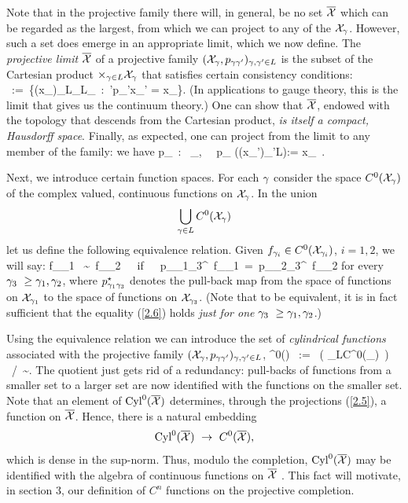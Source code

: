 Note that in the projective family there will, in general, be no set
${{\overline {{\cal X}}}}$ which can be regarded as the largest, from which we can
project to any of the ${\cal X}_\gamma$. However, such a set does emerge in an
appropriate limit, which we now define. The {\it projective limit}
${\overline {{\cal X}}}$ of a projective family $({\cal X}_\gamma, p_{\gamma\gamma'})_{\gamma,\gamma'\in L}$ is the
subset of the Cartesian product $\times_{\gamma\in L}{\cal X}_\gamma$ that
satisfies certain consistency conditions:
%
\be \label{2.4}
\Xb\ :=\ \{(x_\g)_{\g\in L}\in \times_{\g\in L}\X_\g\  
:\ \g'\ge \g \Rightarrow p_{\g\g'}x_{\g'} = x_\g\}. 
\ee
%
(In applications to gauge theory, this is the limit that gives us the
continuum theory.)  One can show that ${\overline {{\cal X}}}$, endowed with the topology
that descends from the Cartesian product, {\it is itself a compact,
Hausdorff space}.  Finally, as expected, one can project from the
limit to any member of the family: we have
%
\be\label{2.5}
 p_{\g}\ : \ \Xb \rightarrow \X_{\g}, \ \  
p_{\g} ((x_{\g'})_{\g'\in L}):= x_{\g}\  .\ee
%

Next, we introduce certain function spaces. For each $\gamma$ consider
the space $C^0({\cal X}_\gamma)$ of the complex valued, continuous functions on
${\cal X}_\gamma$. In the union 
%
$$\bigcup_{\gamma\in L} C^0({\cal X}_{\gamma})$$ 
%
let us define the following equivalence relation. Given $f_{\gamma_i}\in
C^0({\cal X}_{\gamma_i})$, $i=1,2$, we will say:
%
\be
\label{2.6}  f_{\g_1} \ \sim\ f_{\g_2}\ \ \ {\rm if}\ \
\ p_{\g_1\g_3}^\star \ f_{\g_1}\ =\ p_{\g_2\g_3}^\star\ f_{\g_2}\ee 
%
for every $\gamma_3\ \ge \gamma_1,\gamma_2$, where $p^\star_{\gamma_1\gamma_3}$ denotes the
pull-back map from the space of functions on ${\cal X}_{\gamma_1}$ to the space
of functions on ${\cal X}_{\gamma_3}$. (Note that to be equivalent, it is in
fact sufficient that the equality (\ref{2.6}) holds {\it just for one}
$\gamma_3\ \ge \gamma_1,\gamma_2$.) 

Using the equivalence relation we can introduce the set of 
{\it cylindrical functions} associated with the projective 
family $({\cal X}_\gamma,p_{\gamma\gamma'})_{\gamma,\gamma'\in L}$,
%
\be\label{2.7}
\Cyl^0(\Xb) \ := \ \big( \bigcup_{\g\in L}C^0(\X_\g)\ \big)
\ /\ \sim.\ee
%
The quotient just gets rid of a redundancy: pull-backs of functions
from a smaller set to a larger set are now identified with the
functions on the smaller set.  Note that an element of ${\rm Cyl}^0({\overline {{\cal X}}})$
determines, through the projections (\ref{2.5}), a function on
${\overline {{\cal X}}}$. Hence, there is a natural embedding
%
$$
\Cyl^0(\Xb)\ \rightarrow\ C^0(\Xb),
$$
%  
which is dense in the sup-norm. Thus, modulo the completion,
${\rm Cyl}^0({\overline {{\cal X}}})$ may be identified with the algebra of continuous
functions on ${\overline {{\cal X}}}$ \cite{AL2}. This fact will motivate, in section 3,
our definition of $C^n$ functions on the projective completion.

